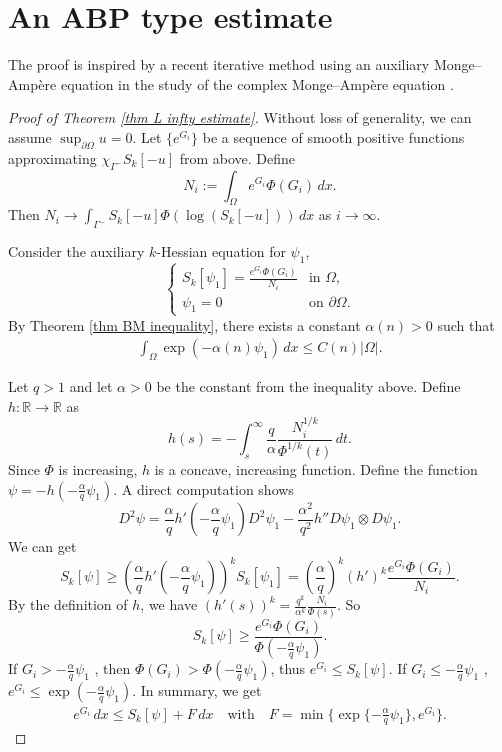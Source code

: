 \documentclass[11pt]{amsart}
\numberwithin{equation}{section}
\numberwithin{equation}{section}
\begin{document}
\vskip 20pt

\section{An ABP type estimate}\label{ABP-pf}
The proof is inspired by a recent iterative method using an auxiliary Monge--Amp\`ere equation in the study of the complex
Monge--Amp\`ere equation \cites{GFT, Liu24}.

\begin{proof}[Proof of Theorem \ref{thm L infty estimate}]
Without loss of generality, we can assume $\sup_{\partial \Omega} u = 0$. 
Let $\{e^{G_i}\}$ be a sequence of smooth positive functions approximating $\chi_{\Gamma^-} S_k[-u]$ from above. Define
\[
N_i := \int_{\Omega} e^{G_i} \Phi(G_i) \,dx.
\]
Then $N_i \to \int_{\Gamma^-} S_k[-u] \Phi(\log(S_k[-u])) \,dx$ as $i \to \infty$.

Consider the auxiliary $k$-Hessian equation for $\psi_1$,
\[
\begin{cases}
S_k[\psi_1] = \frac{e^{G_i} \Phi(G_i)}{N_i} & \text{in } \Omega, \\
\psi_1 = 0 & \text{on } \partial \Omega.
\end{cases}
\]
By Theorem \ref{thm BM inequality}, there exists a constant $\alpha(n) > 0$  such that
\begin{align}\label{upper bd of exp-psi1}
\int_{\Omega} \exp(-\alpha(n) \psi_1) \,dx \le C(n)|\Omega|.
\end{align}

Let $q > 1$ and let $\alpha > 0$ be the constant from the inequality above. Define $h: \mathbb{R} \to \mathbb{R}$ as
\[h(s) = -\int_s^\infty \frac{q}{\alpha} \frac{N_i^{1/k}}{\Phi^{1/k}(t)} \,dt.\]
Since $\Phi$ is increasing, $h$ is a concave, increasing function.
Define the function $\psi = -h(-\frac{\alpha}{q} \psi_1)$. 
A direct computation shows
\[D^2\psi = \frac{\alpha}{q} h'(-\frac{\alpha}{q}\psi_1) D^2\psi_1-\frac{\alpha^2}{q^2}h'' D\psi_1\otimes D\psi_1.\]
We can get
\[
	S_k[\psi] \ge \left(\frac{\alpha}{q} h'(-\frac{\alpha}{q}\psi_1)\right)^k S_k[\psi_1] 
	= \left(\frac{\alpha}{q}\right)^k (h')^k \frac{e^{G_i} \Phi(G_i)}{N_i}.
\]
By the definition of $h$, we have $(h'(s))^k= \frac{q^k}{\alpha^k} \frac{N_i}{\Phi(s)}$. So
\[S_k[\psi] \ge  \frac{e^{G_i} \Phi(G_i)}{\Phi(-\frac{\alpha}{q}\psi_1)}.\]
If $G_i > -\frac{\alpha}{q}\psi_1$ , then $\Phi(G_i)>\Phi(-\frac{\alpha}{q}\psi_1)$, thus $e^{G_i}  \le S_k[\psi]$. If $G_i \le -\frac{\alpha}{q}\psi_1$ , $e^{G_i} \le \exp(-\frac{\alpha}{q}\psi_1)$.
In summary, we get
\begin{align}\label{G_k inequality}
e^{G_i} \,dx \le S_k[\psi] + F \,dx
\quad \text{with} \quad
F = \min\{\exp\{-\frac{\alpha}{q}\psi_1\}, e^{G_i}\}.
\end{align}


\end{proof}
\end{document}
